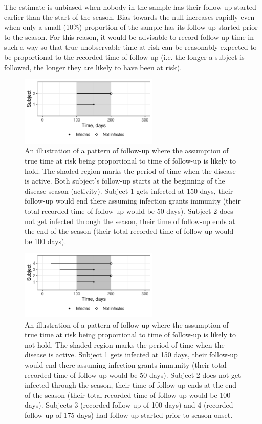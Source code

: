 \documentclass[12pt]{article}
\begin{document}
The estimate is unbiased when nobody in the sample has their follow-up started earlier than the start of the season. Bias towards the null increases rapidly even when only a small (10\%) proportion of the sample has its follow-up started prior to the season. For this reason, it would be advisable to record follow-up time in such a way so that true unobservable time at risk can be reasonably expected to be proportional to the recorded time of follow-up (i.e. the longer a subject is followed, the longer they are likely to have been at risk).

\pagebreak

\begin{figure}[htp]
	\centering
	\includegraphics[width=0.59\textwidth]{../curve-cox/timeplot_3_light.pdf}
	\caption{
	An illustration of a pattern of follow-up where the assumption of true time at risk being proportional to time of follow-up is likely to hold. The shaded region marks the period of time when the disease is active. Both subject's follow-up starts at the beginning of the disease season (activity). Subject 1 gets infected at 150 days, their follow-up would end there assuming infection grants immunity (their total recorded time of follow-up would be 50 days). Subject 2 does not get infected through the season, their time of follow-up ends at the end of the season (their total recorded time of follow-up would be 100 days).
	}
	\label{CoxIdeal}
\end{figure}

\begin{figure}[htp]
	\centering
	\includegraphics[width=0.59\textwidth]{../curve-cox/timeplot_4_light.pdf}
	\caption{
	An illustration of a pattern of follow-up where the assumption of true time at risk being proportional to time of follow-up is likely to not hold. The shaded region marks the period of time when the disease is active. Subject 1 gets infected at 150 days, their follow-up would end there assuming infection grants immunity (their total recorded time of follow-up would be 50 days). Subject 2 does not get infected through the season, their time of follow-up ends at the end of the season (their total recorded time of follow-up would be 100 days). Subjects 3 (recorded follow up of 100 days) and 4 (recorded follow-up of 175 days) had follow-up started prior to season onset.
	}
	\label{CoxNotIdeal}
\end{figure}
\end{document}
